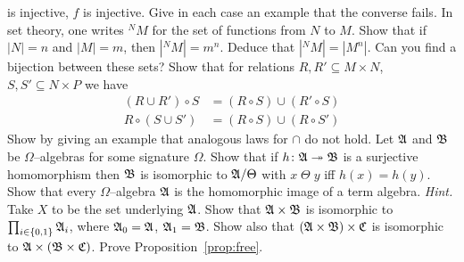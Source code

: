 is injective, $f$ is injective. Give in each case an example that the 
converse fails.
\vplatz
\exercise
In set theory, one writes ${^N}M$ for the set of functions
from $N$ to $M$. Show that if $|N| = n$ and $|M| = m$, then
$|{^N}M| = m^n$. Deduce that $|{^N}M| = |M^n|$. Can you find
a bijection between these sets?
\vplatz
\exercise
Show that for relations $R, R' \subseteq M \times N$,
$S, S' \subseteq N \times P$ we have
\begin{subequations}
\begin{align}
(R \cup R') \circ S & = (R \circ S) \cup (R' \circ S) \\
R \circ (S \cup S') & = (R \circ S) \cup (R \circ S')
\end{align}
\end{subequations}
Show by giving an example that analogous laws for $\cap$ do not hold.
\vplatz 
\exercise 
Let $\mathfrak{A}$ and $\mathfrak{B}$ be $\Omega$--algebras for
some signature $\Omega$. Show that if $h \colon \mathfrak{A} \twoheadrightarrow \mathfrak{B}$ is a
surjective homomorphism then $\mathfrak{B}$ is isomorphic to $\mathfrak{A}/\Theta$
with $x \; \Theta\; y$ iff $h(x) = h(y)$.
\vplatz
\exercise
Show that every $\Omega$--algebra $\mathfrak{A}$ is the homomorphic image
of a term algebra. {\it Hint.} Take $X$ to be the set underlying
$\mathfrak{A}$.
\vplatz
\exercise
Show that $\mathfrak{A}\times\mathfrak{B}$ is isomorphic to $\prod_{i \in \{0,1\}} \mathfrak{A}_i$,
where $\mathfrak{A}_0 = \mathfrak{A}$, $\mathfrak{A}_1 = \mathfrak{B}$. Show also that $(\mathfrak{A}\times\mathfrak{B})
\times \mathfrak{C}$ is isomorphic to $\mathfrak{A} \times (\mathfrak{B} \times \mathfrak{C})$.
\vplatz
\exercise
Prove Proposition~\ref{prop:free}.
